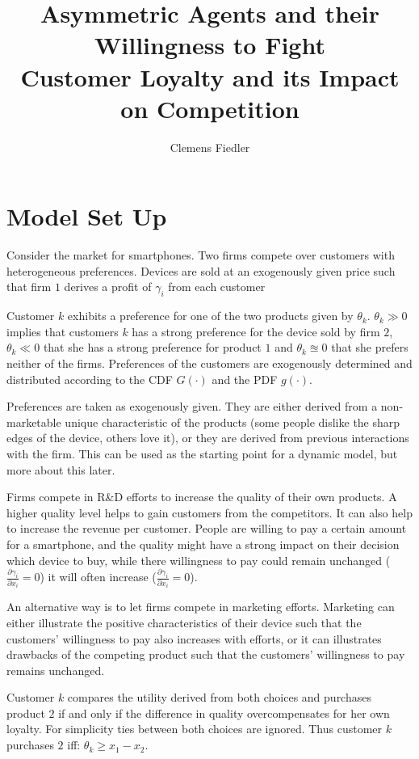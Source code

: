 \documentclass[a4paper, 11pt]{article}
\author{Clemens Fiedler}
\title{Asymmetric Agents and their Willingness to Fight\\
	Customer Loyalty and its Impact on Competition}
\begin{document}
	
\maketitle

\section{Model Set Up}
Consider the market for smartphones. Two firms compete over customers with heterogeneous preferences. Devices are sold at an exogenously given price such that firm $1$ derives a profit of $\gamma_i$ from each customer
 
Customer $k$ exhibits a preference for one of the two products given by $\theta_k$. $\theta_k\gg0$ implies that customers $k$ has a strong preference for the device sold by firm $2$, $\theta_k\ll0$ that she has a strong preference for product $1$ and $\theta_k\approxeq 0$ that she prefers neither of the firms. Preferences of the customers are exogenously determined and distributed according to the CDF $G(\cdot)$ and the PDF $g(\cdot)$.

Preferences are taken as exogenously given. They are either derived from a non-marketable unique characteristic of the products (some people dislike the sharp edges of the device, others love it), or they are derived from previous interactions with the firm. This can be used as the starting point for a dynamic model, but more about this later.

Firms compete in R\&D efforts to increase the quality of their own products. A higher quality level helps to gain customers from the competitors. It can also help to increase the revenue per customer. People are willing to pay a certain amount for a smartphone, and the quality might have a strong impact on their decision which device to buy, while there willingness to pay could remain unchanged ($\frac{\partial \gamma_i}{\partial x_i}=0$) it will often increase ($\frac{\partial \gamma_i}{\partial x_i}=0$).

An alternative way is to let firms compete in marketing efforts. Marketing can either illustrate the positive characteristics of their device such that the customers' willingness to pay also increases with efforts, or it can illustrates drawbacks of the competing product such that the customers' willingness to pay remains unchanged.

Customer $k$ compares the utility derived from both choices and purchases product $2$ if and only if the difference in quality overcompensates for her own loyalty. For simplicity ties between both choices are ignored. Thus customer $k$ purchases $2$ iff:
$\theta_k\geq x_1-x_2$.
\end{document}
